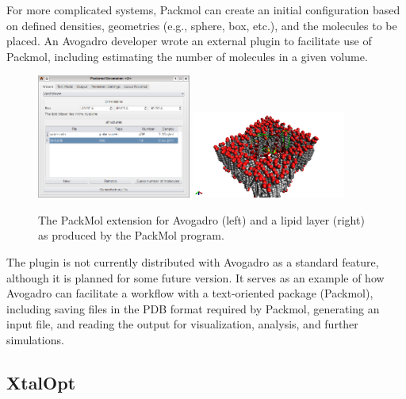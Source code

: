 \documentclass[10pt]{bmc_article}
\newenvironment{bmcformat}{\begin{raggedright}
\baselineskip20pt\sloppy\setboolean{publ}{false}}{\end{raggedright}
\baselineskip20pt\sloppy}
\begin{document}
\begin{bmcformat}
For more complicated systems, Packmol can create an initial
configuration based on defined densities, geometries (e.g., sphere,
box, etc.), and the molecules to be placed. An Avogadro developer wrote
an external plugin to facilitate use of Packmol, including estimating
the number of molecules in a given volume.

\begin{figure}
  \includegraphics[width=0.45\textwidth]{images/packmol-extension}
  \includegraphics[width=0.45\textwidth]{images/packmol-lipid}
  \caption{The PackMol extension for Avogadro (left) and a lipid layer (right)
    as produced by the PackMol program.}
  \label{f:packmol}
\end{figure}

The plugin is not currently distributed with Avogadro as a standard
feature, although it is planned for some future version. It serves as
an example of how Avogadro can facilitate a workflow with a
text-oriented package (Packmol), including saving files in the PDB
format required by Packmol, generating an input file, and reading the
output for visualization, analysis, and further simulations.

\subsection{XtalOpt}


\end{bmcformat}
\end{document}
